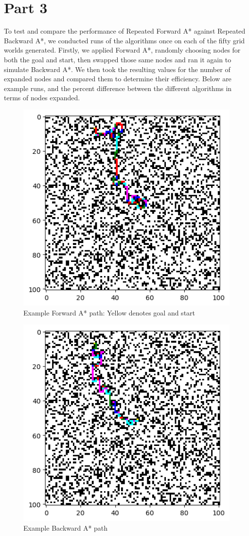 \documentclass{article}
\begin{document}
\section{Part 3}
To test and compare the performance of Repeated Forward A* against Repeated Backward A*, we conducted runs of the algorithms once on each of the fifty grid worlds generated. Firstly, we applied Forward A*, randomly choosing nodes for both the goal and start, then swapped those same nodes and ran it again to simulate Backward A*. We then took the resulting values for the number of expanded nodes and compared them to determine their efficiency. Below are example runs, and the percent difference between the different algorithms in terms of nodes expanded.
\begin{figure}
	\caption{Example Forward A* path: Yellow denotes goal and start}
	\centering
	\includegraphics[scale=0.75]{visF}
\end{figure}
\begin{figure}
	\caption{Example Backward A* path}
	\centering
	\includegraphics[scale=0.75]{visB}
\end{figure}
\end{document}
